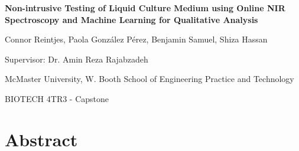 \documentclass[12pt]{report}
\newcommand{\setparindent}{
    \setlength{\parskip}{1em} %
    \setlength{\parindent}{2.5em} %
}
\newcommand\titleofdoc{Non-intrusive Testing of Liquid Culture Medium using Online NIR Spectroscopy and Machine Learning for Qualitative Analysis} %
\begin{document}
\begin{titlepage}
   \begin{center}
        \vspace*{2.5cm} %

        \Large{\bfseries{\titleofdoc}} 

        \vspace{0.5cm}
            
        \vspace{3cm}
       
        \vspace{0.25cm}
        \large{Connor Reintjes, Paola Gonz\'alez P\'erez, Benjamin Samuel, Shiza Hassan}

        \vspace{0.25cm}
        \large{Supervisor: Dr. Amin Reza Rajabzadeh}
       
        \vspace{3 cm}
        \large{McMaster University, W. Booth School of Engineering Practice and Technology}
        
        \vspace{0.25 cm}
        \large{BIOTECH 4TR3 - Capstone}
       

       \vfill
    \end{center}
\end{titlepage}

\setcounter{page}{2}
\pagestyle{fancy}
\fancyhf{}
\rhead{\thepage}

\chapter*{Abstract}
\setparindent
\end{document}
